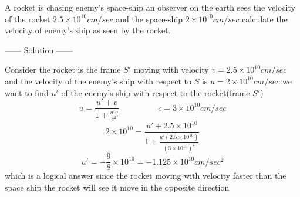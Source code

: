 \documentclass{article}
\begin{document}
\begin{example}
    A rocket is chasing enemy's space-ship an observer on the earth sees the velocity of the rocket 
    $2.5 \times 10^{10}\si{cm/sec}$ and the space-ship $2 \times 10^{10}\si{cm/sec}$ calculate the velocity of enemy's ship as seen by the rocket.
\begin{center}
    ------ \textcolor{Solution}{Solution} ------
\end{center}
Consider the rocket is the frame $S'$ moving with velocity $v=2.5 \times 10^{10}\si{cm/sec}$
and the velocity of the enemy's ship with respect to $S$ is $u=2 \times 10^{10}\si{cm/sec}$ 
we want to find $u'$ of the enemy's ship with respect to the rocket(frame $S'$)
\[
    u = \frac{u'+v}{1+\frac{u'v}{c^2}} 
    \hspace{2cm} 
    c = 3 \times 10^{10}\si{cm/sec}
\]
\[
    2 \times 10^{10} = \frac{u'+2.5 \times 10^{10}}{1+\frac{u'(2.5 \times 10^{10})}{{(3 \times 10^{10})}^2}} 
\]
\[
u' = -\frac{9}{8}\times 10^{10} = -1.125 \times 10^{10}\si{cm/sec^2}
\]
which is a logical answer since the rocket moving with velocity faster than the space ship the rocket will see it move in the opposite direction
\end{example}
\end{document}
